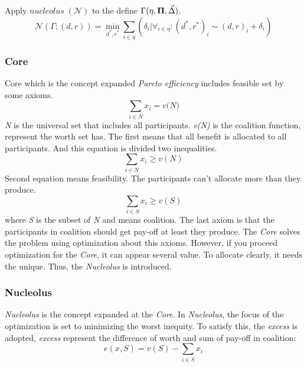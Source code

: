 \documentclass[journal]{IEEEtran} %
\begin{document}
Apply $nucleolus \;(\mathcal{N})$ to the define $\Gamma(\eta, {\bf{\Pi}}, \vec \Delta)$.
\begin{equation}
\mathcal{N}(\Gamma;(d,r))={\min_{d^{*},r^{*}} \sum_{i \in \eta} (\delta_{i}|\forall_{i \in \eta} : (d^{*},r^{*})_{i} \sim (d,r)_{i}+\delta_{i})}
\end{equation}










\newpage
\subsubsection{Core}
Core which is the concept expanded \textit{Pareto efficiency} includes feasible set by some axioms. 
\begin{equation}
\sum\limits_{i\in{N}} x_{i} = \textit{v(N)}
\end{equation}
\textit{N} is the universal set that includes all participants. \textit{v(N)} is the coalition function, represent the worth set has. The first means that all benefit is allocated to all participants. And this equation is divided two inequalities.
\begin{equation}
\sum\limits_{i\in{N}} x_{i} \geq v(N)
\end{equation}
Second equation means feasibility. The participants can't allocate more than they produce.
\begin{equation}
\sum\limits_{i\in{S}} x_{i} \geq v(S)
\end{equation}
where \textit{S} is the subset of \textit{N} and means coalition. The last axiom is that the participants in coalition should get pay-off at least they produce.
The \textit{Core} solves the problem using optimization about this axioms. However, if you proceed optimization for the \textit{Core}, it can  appear several value. To allocate clearly, it needs the unique. Thus, the \textit{Nucleolus} is introduced.

\subsubsection{Nucleolus}
\textit{Nucleolus} is the concept expanded at the \textit{Core}. In \textit{Nucleolus}, the focus of the optimization is set to minimizing the worst inequity. To satisfy this, the \textit{excess} is adopted, \textit{excess} represent the difference of worth and sum of pay-off in coalition:
\begin{equation}
e(x,S) = v(S) - \sum\limits_{i\in{S}} x_i
\end{equation}
\end{document}
